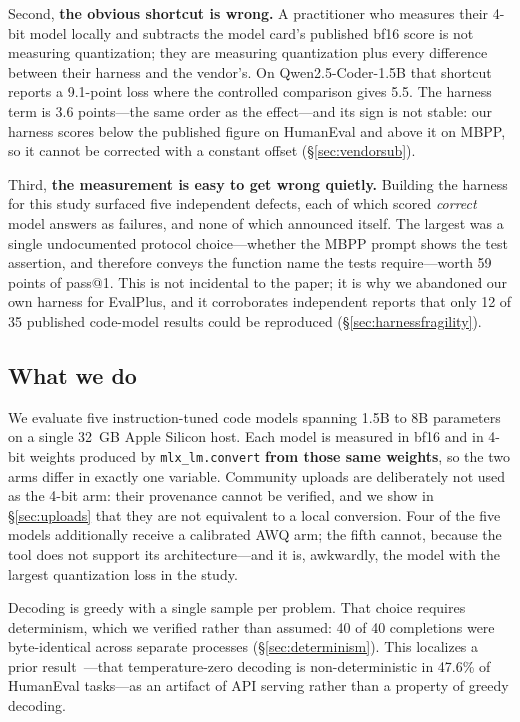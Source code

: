 \documentclass[11pt]{article}
\begin{document}
Second, \textbf{the obvious shortcut is wrong.} A practitioner who measures their 4-bit
model locally and subtracts the model card's published bf16 score is not measuring
quantization; they are measuring quantization plus every difference between their
harness and the vendor's. On Qwen2.5-Coder-1.5B that shortcut reports a 9.1-point loss
where the controlled comparison gives 5.5. The harness term is 3.6 points---the same
order as the effect---and its sign is not stable: our harness scores below the
published figure on HumanEval and above it on MBPP, so it cannot be corrected with a
constant offset (\S\ref{sec:vendorsub}).

Third, \textbf{the measurement is easy to get wrong quietly.} Building the harness for
this study surfaced five independent defects, each of which scored \emph{correct} model
answers as failures, and none of which announced itself. The largest was a single
undocumented protocol choice---whether the MBPP prompt shows the test assertion, and
therefore conveys the function name the tests require---worth 59 points of pass@1. This
is not incidental to the paper; it is why we abandoned our own harness for EvalPlus,
and it corroborates independent reports that only 12 of 35 published code-model results
could be reproduced (\S\ref{sec:harnessfragility}).

\subsection{What we do}

We evaluate five instruction-tuned code models spanning 1.5B to 8B parameters on a
single 32~GB Apple Silicon host. Each model is measured in bf16 and in 4-bit weights
produced by \texttt{mlx\_lm.convert} \textbf{from those same weights}, so the two arms
differ in exactly one variable. Community uploads are deliberately not used as the
4-bit arm: their provenance cannot be verified, and we show in \S\ref{sec:uploads} that
they are not equivalent to a local conversion. Four of the five models additionally
receive a calibrated AWQ arm; the fifth cannot, because the tool does not support its
architecture---and it is, awkwardly, the model with the largest quantization loss in
the study.

Decoding is greedy with a single sample per problem. That choice requires determinism,
which we verified rather than assumed: 40 of 40 completions were byte-identical across
separate processes (\S\ref{sec:determinism}). This localizes a prior
result~\citep{ouyang2025nondeterminism}---that temperature-zero decoding is
non-deterministic in 47.6\% of HumanEval tasks---as an artifact of API serving rather
than a property of greedy decoding.
\end{document}
